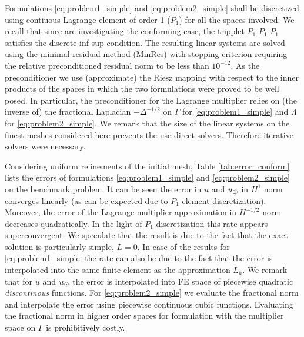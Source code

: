 \documentclass[r]{siamart171218}
\begin{document}
Formulations \eqref{eq:problem1_simple} and \eqref{eq:problem2_simple} shall
be discretized using contiuous Lagrange element of order 1 ($P_1$) for all the spaces
involved. We recall that since are investigating the conforming case, the tripplet
$P_1$-$P_1$-$P_1$ satisfies
the discrete inf-sup condition. The resulting linear systems are solved
using the minimal residual method (MinRes) with stopping criterion requiring the relative
preconditioned residual norm to be less than $10^{-12}$. As the preconditioner
we use (approximate) the Riesz mapping with respect to the inner products of
the spaces in which the two formulations were proved to be well posed.
In particular, the preconditioner for the Lagrange multiplier relies on
(the inverse of) the fractional Laplacian $-\Delta^{-1/2}$ on $\Gamma$ for
\eqref{eq:problem1_simple} and $\Lambda$ for \eqref{eq:problem2_simple}.
We remark that the size of the linear systems on the finest meshes considered
here prevents the use direct solvers. Therefore iterative solvers were necessary. 

Considering uniform refinements of the initial mesh, Table \ref{tab:error_conform}
lists the errors of formulations \eqref{eq:problem1_simple} and \eqref{eq:problem2_simple}
on the benchmark problem. It can be seen the error in $u$ and $u_{\odot}$ in $H^1$ norm
converges linearly (as can be expected due to $P_1$ element discretization).
Moreover, the error of the Lagrange multiplier approximation in $H^{-1/2}$ norm
decreases quadratically. In the light of $P_1$ discretization this rate appears
superconvergent. We speculate that the result is due to the fact that the
exact solution is particularly simple, $L=0$. In case of the results for
\eqref{eq:problem1_simple} the rate can also be due to the fact that the
error is interpolated into the same finite element as the approximation $L_h$.
We remark that for $u$ and $u_{\odot}$ the error is interpolated into FE space of piecewise
quadratic \emph{discontinous} functions. For \eqref{eq:problem2_simple} we
evaluate the fractional norm and interpolate the error using piecewise continuous
cubic functions. Evaluating the fractional norm in higher order spaces
for formulation with the multiplier space on $\Gamma$ is prohibitively costly. 
\end{document}
